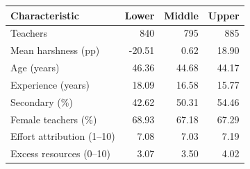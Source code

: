 \begin{tabular}{lrrr}
\toprule
Characteristic & Lower & Middle & Upper \\
\midrule
Teachers & 840 & 795 & 885 \\
Mean harshness (pp) & -20.51 & 0.62 & 18.90 \\
Age (years) & 46.36 & 44.68 & 44.17 \\
Experience (years) & 18.09 & 16.58 & 15.77 \\
Secondary (\%) & 42.62 & 50.31 & 54.46 \\
Female teachers (\%) & 68.93 & 67.18 & 67.29 \\
Effort attribution (1--10) & 7.08 & 7.03 & 7.19 \\
Excess resources (0--10) & 3.07 & 3.50 & 4.02 \\
\bottomrule
\end{tabular}
